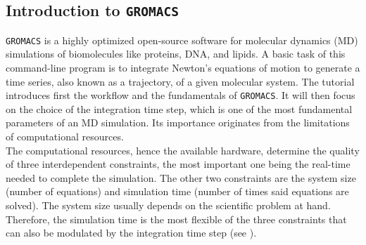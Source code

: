 \documentclass[9pt,tutorial]{livecoms}
\begin{document}
\subsection*{Introduction to \texttt{GROMACS} }
\texttt{GROMACS}\cite{Abraham2015,Hess2008} is a highly optimized open-source software for molecular dynamics (MD) simulations of biomolecules like proteins, DNA, and lipids. A basic task of this command-line program is to integrate Newton's equations of motion to generate a time series, also known as a trajectory, of a given molecular system. The tutorial introduces first the workflow and the fundamentals of \texttt{GROMACS}. It will then focus on the choice of the integration time step, which is one of the most fundamental parameters of an MD simulation. Its importance originates from the limitations of computational resources. \\
The computational resources, hence the available hardware, determine the quality of three interdependent constraints, the most important one being the real-time needed to complete the simulation. The other two constraints are the system size (number of equations) and simulation time (number of times said equations are solved). The system size usually depends on the scientific problem at hand. Therefore, the simulation time is the most flexible of the three constraints that can also be modulated by the integration time step (see ).
\end{document}
